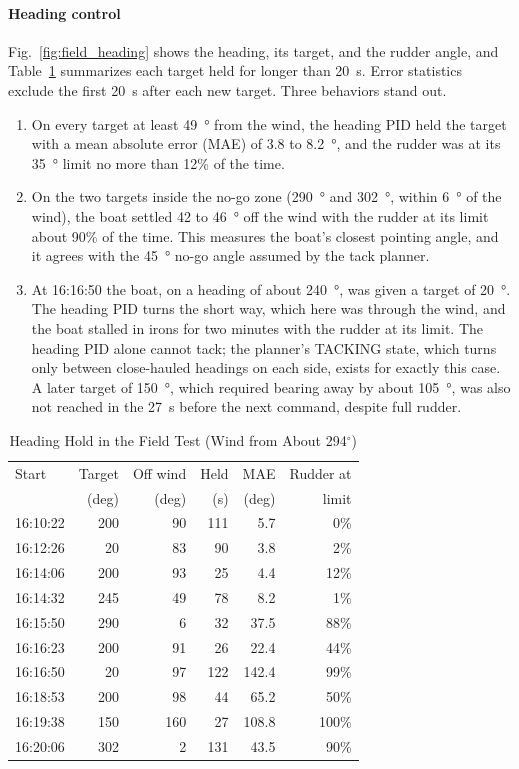 \paragraph*{Heading control}
Fig.~\ref{fig:field_heading} shows the heading, its target, and the rudder
angle, and Table~\ref{tab:field_heading} summarizes each target held for
longer than \SI{20}{\second}. Error statistics exclude the first
\SI{20}{\second} after each new target. Three behaviors stand out.
\begin{enumerate}
\item On every target at least \SI{49}{\degree} from the wind, the heading
PID held the target with a mean absolute error (MAE) of 3.8 to \SI{8.2}{\degree},
and the rudder was at its \SI{35}{\degree} limit no more than 12\% of the
time.
\item On the two targets inside the no-go zone (\SI{290}{\degree} and
\SI{302}{\degree}, within \SI{6}{\degree} of the wind), the boat settled 42 to
\SI{46}{\degree} off the wind with the rudder at its limit about 90\% of the
time. This measures the boat's closest pointing angle, and it agrees with the
\SI{45}{\degree} no-go angle assumed by the tack planner.
\item At 16:16:50 the boat, on a heading of about \SI{240}{\degree}, was
given a target of \SI{20}{\degree}. The heading PID turns the short way,
which here was through the wind, and the boat stalled in irons for two
minutes with the rudder at its limit. The heading PID alone cannot tack; the
planner's TACKING state, which turns only between close-hauled headings on
each side, exists for exactly this case. A later target of \SI{150}{\degree},
which required bearing away by about \SI{105}{\degree}, was also not reached
in the \SI{27}{\second} before the next command, despite full rudder.
\end{enumerate}

\begin{table}[!t]
\caption{Heading Hold in the Field Test (Wind from About 294$^\circ$)}
\label{tab:field_heading}
\centering
\footnotesize
\begin{tabular}{@{}lrrrrr@{}}
\toprule
Start & Target & Off wind & Held & MAE & Rudder at \\
      & (deg)  & (deg)    & (s)  & (deg) & limit \\
\midrule
16:10:22 & 200 & 90  & 111 & 5.7   & 0\% \\
16:12:26 & 20  & 83  & 90  & 3.8   & 2\% \\
16:14:06 & 200 & 93  & 25  & 4.4   & 12\% \\
16:14:32 & 245 & 49  & 78  & 8.2   & 1\% \\
16:15:50 & 290 & 6   & 32  & 37.5  & 88\% \\
16:16:23 & 200 & 91  & 26  & 22.4  & 44\% \\
16:16:50 & 20  & 97  & 122 & 142.4 & 99\% \\
16:18:53 & 200 & 98  & 44  & 65.2  & 50\% \\
16:19:38 & 150 & 160 & 27  & 108.8 & 100\% \\
16:20:06 & 302 & 2   & 131 & 43.5  & 90\% \\
\bottomrule
\end{tabular}
\end{table}

